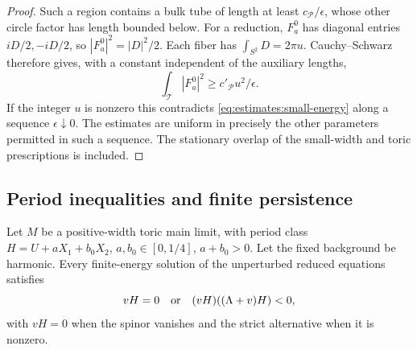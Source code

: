 \begin{proof}
Such a region contains a bulk tube of length at least
$c_{\mathcal P}/\epsilon$, whose other circle factor has length
bounded below.  For a reduction, $F_a^0$ has diagonal entries
$iD/2,-iD/2$, so $|F_a^0|^2=|D|^2/2$.  Each fiber has
$\int_{S^2}D=2\pi u$.  Cauchy--Schwarz therefore gives, with a
constant independent of the auxiliary lengths,
\[
        \int_{\mathcal T}|F_a^0|^2
                       \geq c'_{\mathcal P}u^2/\epsilon.
\]
If the integer $u$ is nonzero this contradicts
\eqref{eq:estimates:small-energy} along a sequence
$\epsilon\downarrow0$.  The estimates are uniform in precisely the
other parameters permitted in such a sequence.  The stationary
overlap of the small-width and toric prescriptions is included.
\end{proof}

\subsection{Period inequalities and finite persistence}

\begin{lemma}
\label{lem:estimates:projection}
Let $M$ be a positive-width toric main limit, with period class
$H=U+aX_1+b_0X_2$, $a,b_0\in[0,1/4]$, $a+b_0>0$.
Let the fixed background be harmonic.  Every finite-energy solution
of the unperturbed reduced equations satisfies
\begin{equation}
        vH=0\quad\hbox{or}\quad
        (vH)((\Lambda+v)H)<0,
        \label{eq:estimates:period}
\end{equation}
with $vH=0$ when the spinor vanishes and the strict alternative when
it is nonzero.
\end{lemma}

